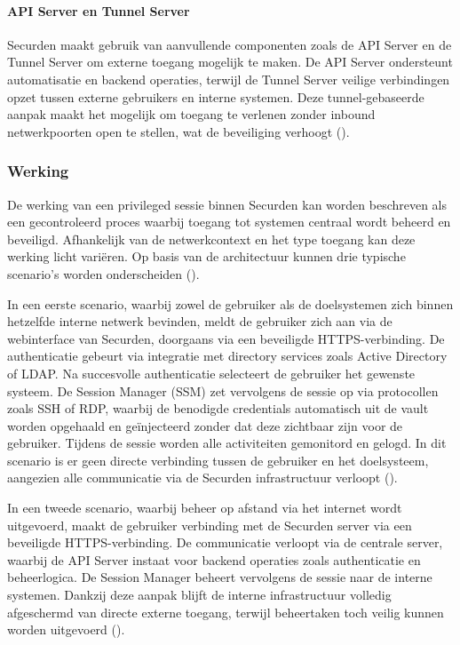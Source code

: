 \paragraph{API Server en Tunnel Server}
Securden maakt gebruik van aanvullende componenten zoals de API Server en de Tunnel Server om externe toegang mogelijk te maken. De API Server ondersteunt automatisatie en backend operaties, terwijl de Tunnel Server veilige verbindingen opzet tussen externe gebruikers en interne systemen. Deze tunnel-gebaseerde aanpak maakt het mogelijk om toegang te verlenen zonder inbound netwerkpoorten open te stellen, wat de beveiliging verhoogt (\cite{securden_server_connectivity,securden_remote_gateway,securden_sdk_api}).

\subsubsection{Werking}
De werking van een privileged sessie binnen Securden kan worden beschreven als een gecontroleerd proces waarbij toegang tot systemen centraal wordt beheerd en beveiligd. Afhankelijk van de netwerkcontext en het type toegang kan deze werking licht variëren. Op basis van de architectuur kunnen drie typische scenario’s worden onderscheiden (\cite{securden_pam}).

In een eerste scenario, waarbij zowel de gebruiker als de doelsystemen zich binnen hetzelfde interne netwerk bevinden, meldt de gebruiker zich aan via de webinterface van Securden, doorgaans via een beveiligde HTTPS-verbinding. De authenticatie gebeurt via integratie met directory services zoals Active Directory of LDAP. Na succesvolle authenticatie selecteert de gebruiker het gewenste systeem. De Session Manager (SSM) zet vervolgens de sessie op via protocollen zoals SSH of RDP, waarbij de benodigde credentials automatisch uit de vault worden opgehaald en geïnjecteerd zonder dat deze zichtbaar zijn voor de gebruiker. Tijdens de sessie worden alle activiteiten gemonitord en gelogd. In dit scenario is er geen directe verbinding tussen de gebruiker en het doelsysteem, aangezien alle communicatie via de Securden infrastructuur verloopt (\cite{securden_pam,securden_session_monitoring}).

In een tweede scenario, waarbij beheer op afstand via het internet wordt uitgevoerd, maakt de gebruiker verbinding met de Securden server via een beveiligde HTTPS-verbinding. De communicatie verloopt via de centrale server, waarbij de API Server instaat voor backend operaties zoals authenticatie en beheerlogica. De Session Manager beheert vervolgens de sessie naar de interne systemen. Dankzij deze aanpak blijft de interne infrastructuur volledig afgeschermd van directe externe toegang, terwijl beheertaken toch veilig kunnen worden uitgevoerd (\cite{securden_server_connectivity,securden_sdk_api}).


